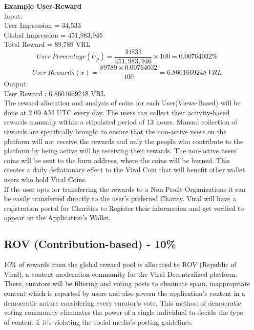 \documentclass[10pt]{article}
\begin{document}
\textbf{Example User-Reward}\\

Input:\\
User Impression = 34,533\\
Global Impression = 451,983,946\\
Total Reward = 89,789 VRL\\

\begin{equation}
User\:Percentage(U_p)=\frac{34533}{451,983,946} \times 100 = 0.00764032\%
\end{equation}
\begin{equation}
User\:Rewards(x)=\frac{89789 \times 0.00764032}{100} = 6.8601669248\:VRL
\end{equation}
Output:\\
User Reward : 6.8601669248 VRL\\


The reward allocation and analysis of coins for each User(Views-Based) will be done at 2.00 AM UTC every day. The users can collect their activity-based rewards manually within a stipulated period of 13 hours. Manual collection of rewards are specifically brought to ensure that the non-active users on the platform will not receive the rewards and only the people who contribute to the platform by being active will be receiving their rewards. The non-active users' coins will be sent to the burn address, where the coins will be burned. This creates a daily deflationary effect to the Viral Coin that will benefit other wallet users who hold Viral Coins.\\

If the user opts for transferring the rewards to a Non-Profit-Organizations it can be easily transferred directly to the user's preferred Charity. Viral will have a registration portal for Charities to Register their information and get verified to appear on the Application's Wallet. 

\subsection{ROV (Contribution-based) - 10\%}

10\% of rewards from the global reward pool is allocated to ROV (Republic of Viral), a content moderation community for the Viral Decentralized platform. There, curators will be filtering and voting posts to eliminate spam, inappropriate content which is reported by users and also govern the application's content in a democratic nature considering every curator's vote. This method of democratic voting community eliminates the power of a single individual to decide the type of content if it's violating the social media's posting guidelines. \\
\end{document}

